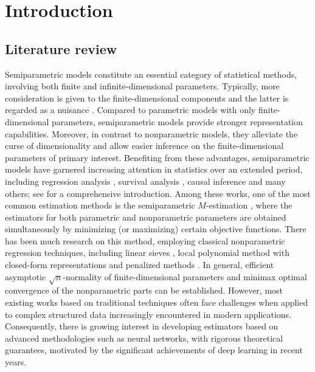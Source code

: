 \section{Introduction}\label{sec:intro}
\subsection{Literature review}
Semiparametric models constitute an essential category of statistical methods, involving both finite and infinite-dimensional parameters. 
Typically, more consideration is given to the finite-dimensional components and the latter is regarded as a nuisance \citep{van2000asymptotic, kosorok2008introduction}. 
Compared to parametric models with only finite-dimensional parameters, semiparametric models provide stronger representation capabilities. Moreover, in contrast to nonparametric models, they alleviate the curse of dimensionality and allow easier inference on the finite-dimensional parameters of primary interest. 
Benefiting from these advantages, semiparametric models have garnered increasing attention in statistics over an extended period, including regression analysis \citep{
ahmad2005efficient,liang2010estimation}, 
survival analysis \citep{cox1972regression, cox1975partial, huang1999efficient,zeng2007maximum}, causal inference \citep{rosenbaum1983central, chernozhukov2018double} 
and many others; 
see \citet{
tsiatis2006semiparametric,kosorok2008introduction,horowitz2012semiparametric} 
for a comprehensive introduction. 
Among these works, one of the most common estimation methods is the semiparametric $M$-estimation \citep{geer2000empirical,ma2005robust,cheng2010bootstrap}, where the estimators for both parametric and nonparametric parameters are obtained simultaneously by minimizing (or maximizing) certain objective functions.
There has been much research on this method, employing classical nonparametric regression techniques, including linear sieves \citep{ding2011sieve,ma2021estimation,tang2023survival},
local polynomial method with closed-form representations \citep{wang2010estimation,liang2010estimation} 
and penalized methods \citep{mammen1997penalized,ma2005penalized}.
In general, efficient asymptotic $\sqrt{n}$-normality of finite-dimensional parameters and minimax optimal convergence of the nonparametric parts can be established. 
However, most existing works based on traditional techniques often face challenges when applied to complex structured data increasingly encountered in modern applications.
Consequently, there is growing interest in developing estimators based on advanced methodologies such as neural networks, with rigorous theoretical guarantees, motivated by the significant achievements of deep learning in recent years. 


